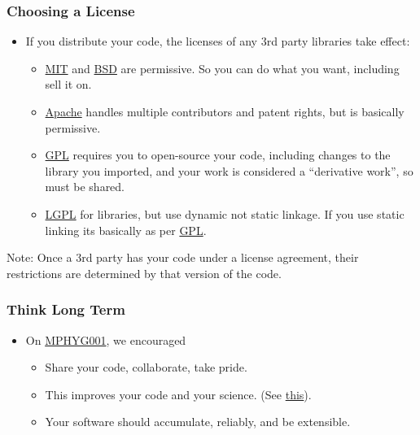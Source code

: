 \subsubsection{Choosing a License}\label{choosing-a-license}

\begin{itemize}
\itemsep1pt\parskip0pt
\item
  If you distribute your code, the licenses of any 3rd party libraries
  take effect:

  \begin{itemize}
  \itemsep1pt\parskip0pt
  \item
    \href{http://opensource.org/licenses/MIT}{MIT} and
    \href{http://opensource.org/licenses/BSD-3-Clause}{BSD} are
    permissive. So you can do what you want, including sell it on.
  \item
    \href{http://opensource.org/licenses/Apache-2.0}{Apache} handles
    multiple contributors and patent rights, but is basically
    permissive.
  \item
    \href{http://opensource.org/licenses/gpl-license}{GPL} requires you
    to open-source your code, including changes to the library you
    imported, and your work is considered a ``derivative work'', so must
    be shared.
  \item
    \href{http://opensource.org/licenses/lgpl-license}{LGPL} for
    libraries, but use dynamic not static linkage. If you use static
    linking its basically as per
    \href{http://opensource.org/licenses/gpl-license}{GPL}.
  \end{itemize}
\end{itemize}

Note: Once a 3rd party has your code under a license agreement, their
restrictions are determined by that version of the code.

\subsubsection{Think Long Term}\label{think-long-term}

\begin{itemize}
\itemsep1pt\parskip0pt
\item
  On
  \href{http://development.rc.ucl.ac.uk/training/engineering}{MPHYG001},
  we encouraged

  \begin{itemize}
  \itemsep1pt\parskip0pt
  \item
    Share your code, collaborate, take pride.
  \item
    This improves your code and your science. (See
    \href{http://www.nature.com/news/2010/101013/full/467753a.html}{this}).
  \item
    Your software should accumulate, reliably, and be extensible.
  \end{itemize}
\end{itemize}

